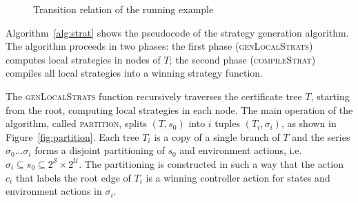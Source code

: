 
\begin{figure}
    \centering
    \caption{Transition relation of the running example}
    \label{fig:stratExample}
\end{figure}

Algorithm~\ref{alg:strat} shows the pseudocode of the strategy generation algorithm.  The algorithm proceeds in two phases: the first phase (\textsc{genLocalStrats}) computes local strategies in nodes of $T$; the second phase (\textsc{compileStrat}) compiles all local strategies into a winning strategy function.

The \textsc{genLocalStrats} function recursively traverses the certificate tree $T$, starting from the root, computing local strategies in each node.  The main operation of the algorithm, called \textsc{partition}, splits $(T, s_0)$ into $i$ tuples $(T_i, \sigma_i)$, as shown in Figure~\ref{fig:partition}.  Each tree $T_i$ is a copy of a single branch of $T$ and the series $\sigma_0 ... \sigma_i$ forms a disjoint partitioning of $s_0$ and environment actions, i.e. $\sigma_i \subseteq s_0 \subseteq 2^{\mathcal{S}} \times 2^{\mathcal{U}}$.  The partitioning is constructed in such a way that the action $c_i$ that labels the root edge of $T_i$ is a winning controller action for states and environment actions in $\sigma_i$.

